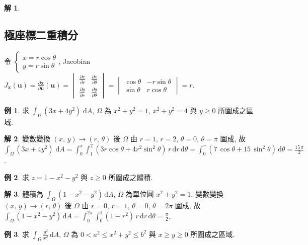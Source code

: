 \documentclass[12pt]{extarticle}
\newcommand{\ds}{\displaystyle}
\theoremstyle{definition}
\newtheorem*{ex}{例}
\newtheorem*{sol}{解}
\newcommand{\vu}{\mathbf{u}}
\newcommand{\vx}{\mathbf{x}}
\begin{document}
\begin{sol}
\begin{enumerate}
  \end{enumerate}
\end{sol}

\subsection*{極座標二重積分}

令 $\ds\begin{cases}x = r\cos\theta \\ y = r\sin\theta \end{cases}\!\!\!\!\!$, Jacobian $\ds J_{\vx}(\vu) = \frac{\partial\vx}{\partial\vu}(\vu) = \begin{vmatrix}\frac{\partial x}{\partial r} & \frac{\partial x}{\partial\theta} \\ \frac{\partial y}{\partial r}& \frac{\partial y}{\partial\theta}\end{vmatrix} = \begin{vmatrix}\cos\theta & -r\sin\theta\\ \sin\theta & r\cos\theta\end{vmatrix} = r$.

\begin{ex}
  求 $\ds\int_\Omega\!(3x + 4y^2)\;\text{d}A$, $\Omega$ 為 $x^2 + y^2 = 1$, $x^2 + y^2 = 4$ 與 $y\geqslant 0$ 所圍成之區域. 
\end{ex}

\begin{sol}
  變數變換 $(x,\,y)\to(r,\,\theta)$ 後 $\Omega$ 由 $r = 1$, $r = 2$, $\theta = 0$, $\ds\theta = \pi$ 圍成, 故 $\ds\int_\Omega\!(3x + 4y^2)\;\text{d}A = \int_0^\pi\!\int_1^2\!(3r\cos\theta + 4r^2\sin^2\theta)\,r\,\text{d}r\,\text{d}\theta = \int_0^\pi\!(7\,\cos\theta + 15\,\sin^2\theta)\,\text{d}\theta = \frac{15\,\pi}{2}$.
\end{sol}

\begin{ex}
  求 $z = 1 - x^2 - y^2$ 與 $z \geqslant 0$ 所圍成之體積. 
\end{ex}

\begin{sol}
  體積為 $\ds\int_\Omega\!(1 - x^2 - y^2)\,\text{d}A$, $\Omega$ 為單位圓 $x^2 + y^2 = 1$. 變數變換 $(x,\,y)\to(r,\,\theta)$ 後 $\Omega$ 由 $r = 0$, $r = 1$, $\theta = 0$, $\theta = 2\pi$ 圍成, 故 $\ds\int_\Omega\!(1 - x^2 - y^2)\,\text{d}A = \int_0^{2\pi}\!\!\int_0^1\!(1 - r^2)\,r\,\text{d}r\,\text{d}\theta = \frac{\pi}{2}$.
\end{sol}

\begin{ex}
  求 $\ds\int_\Omega\frac{y^2}{x^2}\,\text{d}A$, $\Omega$ 為 $0 < a^2\leqslant x^2 + y^2\leqslant b^2$ 與 $x\geqslant y\geqslant 0$ 所圍成之區域. 
\end{ex}
\end{document}
